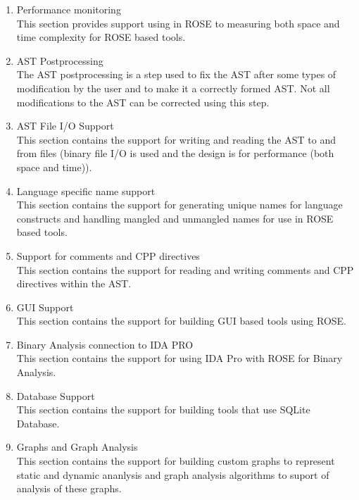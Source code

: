 \begin{enumerate}
\begin{enumerate}
      \item Performance monitoring \\
         This section provides support using in ROSE to measuring both space and 
         time complexity for ROSE based tools.

      \item AST Postprocessing \\
         The AST postprocessing is a step used to fix the AST after some types of 
         modification by the user and to make it a correctly formed AST. Not all
         modifications to the AST can be corrected using this step.

      \item AST File I/O Support \\
         This section contains the support for writing and reading the AST to and from
         files (binary file I/O is used and the design is for performance (both space and
         time)).

      \item Language specific name support \\
         This section contains the support for generating unique names for language
         constructs and handling mangled and unmangled names for use in ROSE based tools.

      \item Support for comments and CPP directives \\
         This section contains the support for reading and writing comments and CPP
         directives within the AST.

      \item GUI Support \\
         This section contains the support for building GUI based tools using ROSE.

      \item Binary Analysis connection to IDA PRO \\
         This section contains the support for using IDA Pro with ROSE for Binary Analysis.

      \item Database Support \\
         This section contains the support for building tools that use SQLite Database.

      \item Graphs and Graph Analysis \\
         This section contains the support for building custom graphs to represent static
         and dynamic ananlysis and graph analysis algorithms to suport of analysis of
         these graphs.


\end{enumerate}
\end{enumerate}

